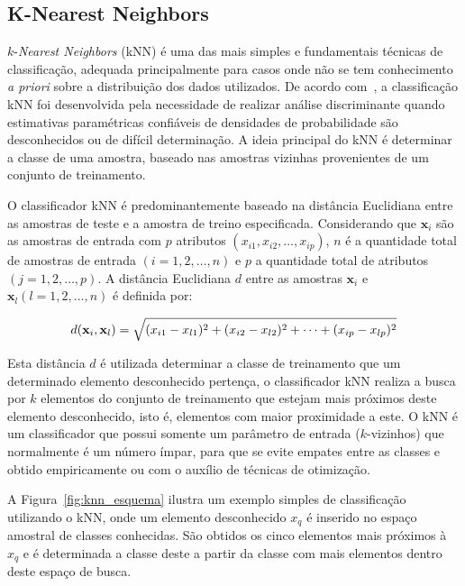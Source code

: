 \subsection{K-Nearest Neighbors}

$k$-\textit{Nearest Neighbors} (kNN) é uma das mais simples e fundamentais técnicas de classificação, adequada principalmente para casos onde não se tem conhecimento \textit{a priori} sobre a distribuição dos dados utilizados. De acordo com~, a classificação kNN foi desenvolvida pela necessidade de realizar análise discriminante quando estimativas paramétricas confiáveis de densidades de probabilidade são desconhecidos ou de difícil determinação. A ideia principal do kNN é determinar a classe de uma amostra, baseado nas amostras vizinhas provenientes de um conjunto de treinamento.

O classificador kNN é predominantemente baseado na distância Euclidiana entre as amostras de teste e a amostra de treino especificada. Considerando que $\textbf{x}_i$ são as amostras de entrada com $p$ atributos $(x_{i1}, x_{i2},\ldots, x_{ip})$, $n$ é a quantidade total de amostras de entrada $(i=1,2,\ldots,n)$ e $p$ a quantidade total de atributos $(j=1,2,\ldots,p)$. A distância Euclidiana $d$ entre as amostras $\textbf{x}_i$ e $\textbf{x}_l (l=1,2,\ldots,n)$ é definida por:

\begin{equation}
	d({\textbf x}_i,{\textbf x}_l) = \sqrt{(x_{i1}-x_{l1})^2 + (x_{i2}-x_{l2})^2 + \cdots + (x_{ip}-x_{lp})^2}
\end{equation}

Esta distância $d$ é utilizada determinar a classe de treinamento que um determinado elemento desconhecido pertença, o classificador kNN realiza a busca por $k$ elementos do conjunto de treinamento que estejam mais próximos deste elemento desconhecido, isto é, elementos com maior proximidade a este. O kNN é um classificador que possui somente um parâmetro de entrada ($k$-vizinhos) que normalmente é um número ímpar, para que se evite empates entre as classes e obtido empiricamente ou com o auxílio de técnicas de otimização.

A Figura~\ref{fig:knn_esquema} ilustra um exemplo simples de classificação utilizando o kNN, onde um elemento desconhecido $x_q$ é inserido no espaço amostral de classes conhecidas. São obtidos os cinco elementos mais próximos à $x_q$ e é determinada a classe deste a partir da classe com mais elementos dentro deste espaço de busca. 

